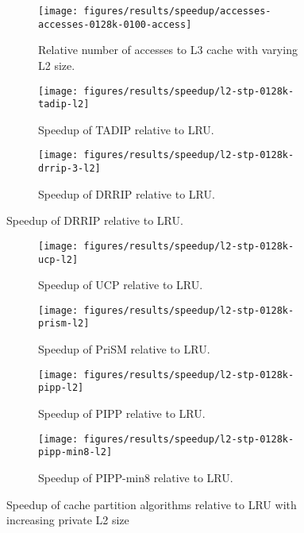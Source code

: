 \begin{figure}[!htb]
    \centering
    \begin{subfigure}[b]{0.5\textwidth}
        \texttt{[image: figures/results/speedup/accesses-accesses-0128k-0100-access]}
        \caption{Relative number of accesses to L3 cache with varying L2 size.}
        \label{fig:results:l2:access}
    \end{subfigure}
    \begin{subfigure}[b]{0.5\textwidth}
        \texttt{[image: figures/results/speedup/l2-stp-0128k-tadip-l2]}
        \caption{Speedup of TADIP relative to LRU.}
        \label{fig:results:l2:tadip}
    \end{subfigure}%
    \begin{subfigure}[b]{0.5\textwidth}
        \texttt{[image: figures/results/speedup/l2-stp-0128k-drrip-3-l2]}
        \caption{Speedup of DRRIP relative to LRU.}
        \label{fig:results:l2:drrip}
    \end{subfigure}
\end{figure}
\clearpage
\begin{figure}[!htb]
    \ContinuedFloat
    \begin{subfigure}[b]{0.5\textwidth}
        \texttt{[image: figures/results/speedup/l2-stp-0128k-ucp-l2]}
        \caption{Speedup of UCP relative to LRU.}
        \label{fig:results:l2:ucp}
    \end{subfigure}%
    \begin{subfigure}[b]{0.5\textwidth}
        \texttt{[image: figures/results/speedup/l2-stp-0128k-prism-l2]}
        \caption{Speedup of PriSM relative to LRU.}
        \label{fig:results:l2:prism}
    \end{subfigure}
    \begin{subfigure}[b]{0.5\textwidth}
        \texttt{[image: figures/results/speedup/l2-stp-0128k-pipp-l2]}
        \caption{Speedup of PIPP relative to LRU.}
        \label{fig:results:l2:pipp}
    \end{subfigure}%
    \begin{subfigure}[b]{0.5\textwidth}
        \texttt{[image: figures/results/speedup/l2-stp-0128k-pipp-min8-l2]}
        \caption{Speedup of PIPP-min8 relative to LRU.}
        \label{fig:results:l2:pipp-min8}
    \end{subfigure}
    \caption{Speedup of cache partition algorithms relative to LRU with increasing private L2 size}
    \label{fig:results:l2}
\end{figure}